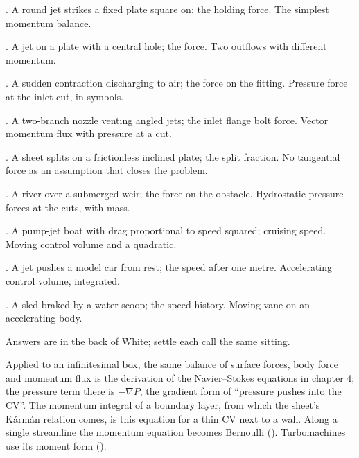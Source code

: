 \begin{ladder}
\item {}. A round jet strikes a fixed plate square on; the holding force. The simplest momentum balance.
\item {}. A jet on a plate with a central hole; the force. Two outflows with different momentum.
\item {}. A sudden contraction discharging to air; the force on the fitting. Pressure force at the inlet cut, in symbols.
\item {}. A two-branch nozzle venting angled jets; the inlet flange bolt force. Vector momentum flux with pressure at a cut.
\item {}. A sheet splits on a frictionless inclined plate; the split fraction. No tangential force as an assumption that closes the problem.
\item {}. A river over a submerged weir; the force on the obstacle. Hydrostatic pressure forces at the cuts, with mass.
\item {}. A pump-jet boat with drag proportional to speed squared; cruising speed. Moving control volume and a quadratic.
\item {}. A jet pushes a model car from rest; the speed after one metre. Accelerating control volume, integrated.
\item {}. A sled braked by a water scoop; the speed history. Moving vane on an accelerating body.
\end{ladder}
Answers are in the back of White; settle each call the same sitting.


\begin{hides}
Applied to an infinitesimal box, the same balance of surface forces, body force and momentum flux is the derivation of the Navier--Stokes equations in chapter 4; the pressure term there is $-\nabla P$, the gradient form of ``pressure pushes into the CV''. The momentum integral of a boundary layer, from which the sheet's K\'arm\'an relation comes, is this equation for a thin CV next to a wall. Along a single streamline the momentum equation becomes Bernoulli (). Turbomachines use its moment form ().
\end{hides}
